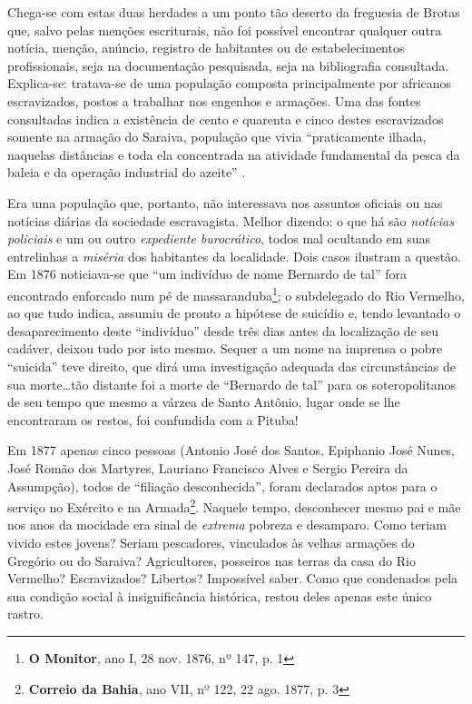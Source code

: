 Chega-se com estas duas herdades a um ponto tão deserto da freguesia de Brotas que, salvo pelas menções escriturais, não foi possível encontrar qualquer outra notícia, menção, anúncio, registro de habitantes ou de estabelecimentos profissionais, seja na documentação pesquisada, seja na bibliografia consultada. Explica-se: tratava-se de uma população composta principalmente por africanos escravizados, postos a trabalhar nos engenhos e armações. Uma das fontes consultadas indica a existência de cento e quarenta e cinco destes escravizados somente na armação do Saraiva, população que vivia ``praticamente ilhada, naquelas distâncias e toda ela concentrada na atividade fundamental da pesca da baleia e da operação industrial do azeite'' \cite[p.~122]{SAMPAIO2005}.

Era uma população que, portanto, não interessava nos assuntos oficiais ou nas notícias diárias da sociedade escravagista. Melhor dizendo: o que há são \textit{notícias policiais} e um ou outro \textit{expediente burocrático}, todos mal ocultando em suas entrelinhas a \textit{miséria} dos habitantes da localidade. Dois casos ilustram a questão. Em 1876 noticiava-se que ``um indivíduo de nome Bernardo de tal'' fora encontrado enforcado num pé de massaranduba\footnote{\textbf{O Monitor}, ano I, 28 nov. 1876, nº 147, p. 1}; o subdelegado do Rio Vermelho, ao que tudo indica, assumiu de pronto a hipótese de suicídio e, tendo levantado o desaparecimento deste ``indivíduo'' desde três dias antes da localização de seu cadáver, deixou tudo por isto mesmo. Sequer a um nome na imprensa o pobre ``suicida'' teve direito, que dirá uma investigação adequada das circunstâncias de sua morte\dots tão distante foi a morte de ``Bernardo de tal'' para os soteropolitanos de seu tempo que mesmo a várzea de Santo Antônio, lugar onde se lhe encontraram os restos, foi confundida com a Pituba!

Em 1877 apenas cinco pessoas (Antonio José dos Santos, Epiphanio José Nunes, José Romão dos Martyres, Lauriano Francisco Alves e Sergio Pereira da Assumpção), todos de ``filiação desconhecida'', foram declarados aptos para o serviço no Exército e na Armada\footnote{\textbf{Correio da Bahia}, ano VII, nº 122, 22 ago. 1877, p. 3}. Naquele tempo, desconhecer mesmo pai e mãe nos anos da mocidade era sinal de \textit{extrema} pobreza e desamparo. Como teriam vivido estes jovens? Seriam pescadores, vinculados às velhas armações do Gregório ou do Saraiva? Agricultores, posseiros nas terras da casa do Rio Vermelho? Escravizados? Libertos? Impossível saber. Como que condenados pela sua condição social à insignificância histórica, restou deles apenas este único rastro.

